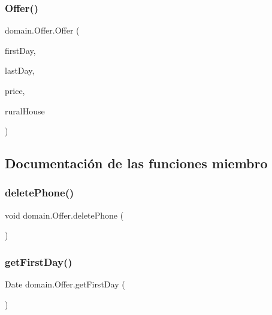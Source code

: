 \mbox{\label{classdomain_1_1_offer_ae977cf0dae1332eb9d0b97252cc15078}} 
\subsubsection{\texorpdfstring{Offer()}{Offer()}\hspace{0.1cm}{\footnotesize\ttfamily [3/3]}}
{\footnotesize\ttfamily domain.\+Offer.\+Offer (\begin{DoxyParamCaption}\item[{Date}]{first\+Day,  }\item[{Date}]{last\+Day,  }\item[{float}]{price,  }\item[{\mbox{\hyperlink{classdomain_1_1_rural_house}{Rural\+House}}}]{rural\+House }\end{DoxyParamCaption})}



\subsection{Documentación de las funciones miembro}
\mbox{\label{classdomain_1_1_offer_a5eed495d6abcc8635d4e702cf39779c7}} 
\subsubsection{\texorpdfstring{deletePhone()}{deletePhone()}}
{\footnotesize\ttfamily void domain.\+Offer.\+delete\+Phone (\begin{DoxyParamCaption}{ }\end{DoxyParamCaption})}

\mbox{\label{classdomain_1_1_offer_ae13ac55ba469cb34e004d6aff68430fb}} 
\subsubsection{\texorpdfstring{getFirstDay()}{getFirstDay()}}
{\footnotesize\ttfamily Date domain.\+Offer.\+get\+First\+Day (\begin{DoxyParamCaption}{ }\end{DoxyParamCaption})}

